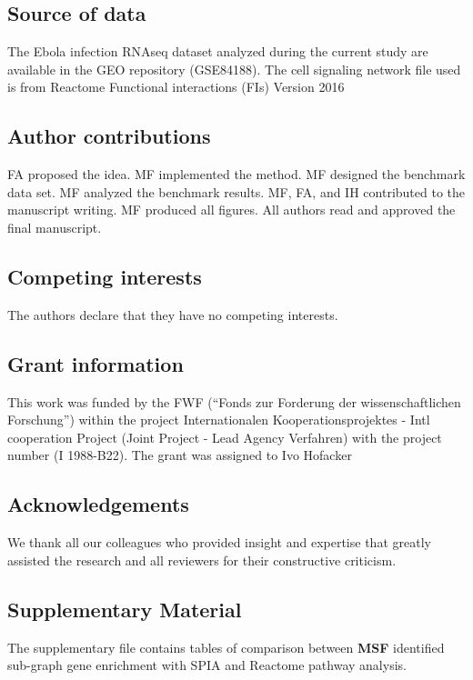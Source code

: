 \documentclass[10pt,a4paper,twocolumn]{article}
\begin{document}
\subsection*{Source of data}

The Ebola infection RNAseq dataset analyzed during the current study
are available in the GEO repository (GSE84188). The cell signaling
network file used is from Reactome Functional interactions (FIs)
Version 2016


\subsection*{Author contributions}
FA proposed the idea. MF implemented the method. MF designed the
benchmark data set. MF analyzed the benchmark results. MF, FA, and IH
contributed to the manuscript writing. MF produced all figures. All
authors read and approved the final manuscript.

\subsection*{Competing interests}

The authors declare that they have no competing interests.


\subsection*{Grant information}

This work was funded by the FWF (“Fonds zur Forderung der
wissenschaftlichen Forschung”) within the project Internationalen
Kooperationsprojektes - Intl cooperation Project (Joint Project - Lead
Agency Verfahren) with the project number (I 1988-B22). The grant was
assigned to Ivo Hofacker


\subsection*{Acknowledgements}

We thank all our colleagues who provided insight and expertise that
greatly assisted the research and all reviewers for their constructive
criticism.

\subsection*{Supplementary Material}

The supplementary file contains tables of comparison between
\textbf{MSF} identified sub-graph gene enrichment with SPIA and
Reactome pathway analysis.
\end{document}
